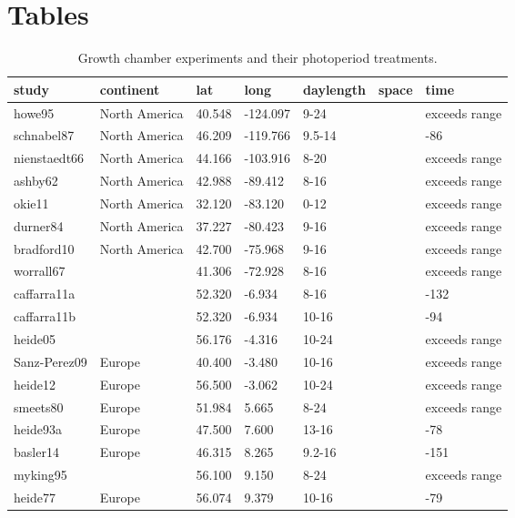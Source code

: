 \documentclass{article}
\begin{document}
\section* {Tables}
\begin{table}[ht]
\centering
\caption{Growth chamber experiments and their photoperiod treatments.} 
\label{table:phototreats}
\begin{tabular}{|p{}|p{}|p{}|p{}|p{}|p{}|p{}|}
  \hline
study & continent & lat & long & daylength & space & time \\ 
  \hline
howe95 & North America & 40.548 & -124.097 & 9-24 &  & exceeds range \\ 
  schnabel87 & North America & 46.209 & -119.766 & 9.5-14 &  & -86 \\ 
  nienstaedt66 & North America & 44.166 & -103.916 & 8-20 &  & exceeds range \\ 
  ashby62 & North America & 42.988 & -89.412 & 8-16 &  & exceeds range \\ 
  okie11 & North America & 32.120 & -83.120 & 0-12 &  & exceeds range \\ 
  durner84 & North America & 37.227 & -80.423 & 9-16 &  & exceeds range \\ 
  bradford10 & North America & 42.700 & -75.968 & 9-16 &  & exceeds range \\ 
  worrall67 &  & 41.306 & -72.928 & 8-16 &  & exceeds range \\ 
  caffarra11a &  & 52.320 & -6.934 & 8-16 &  & -132 \\ 
  caffarra11b &  & 52.320 & -6.934 & 10-16 &  & -94 \\ 
  heide05 &  & 56.176 & -4.316 & 10-24 &  & exceeds range \\ 
  Sanz-Perez09 & Europe & 40.400 & -3.480 & 10-16 &  & exceeds range \\ 
  heide12 & Europe & 56.500 & -3.062 & 10-24 &  & exceeds range \\ 
  smeets80 & Europe & 51.984 & 5.665 & 8-24 &  & exceeds range \\ 
  heide93a & Europe & 47.500 & 7.600 & 13-16 &  & -78 \\ 
  basler14 & Europe & 46.315 & 8.265 & 9.2-16 &  & -151 \\ 
  myking95 &  & 56.100 & 9.150 & 8-24 &  & exceeds range \\ 
  heide77 & Europe & 56.074 & 9.379 & 10-16 &  & -79 \\ 

\end{tabular}
\end{table}
\end{document}
